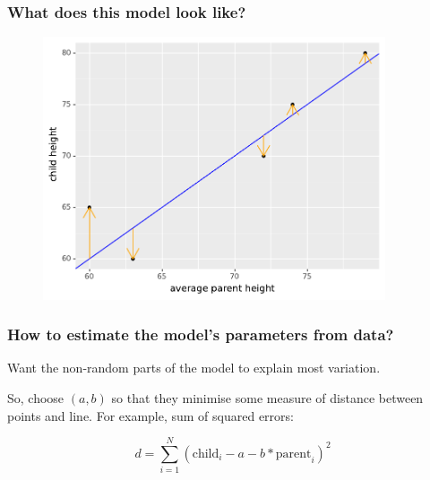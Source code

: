\documentclass[handout]{beamer}
\begin{document}
\begin{frame}
	\frametitle{What does this model look like?}
	
	\begin{figure}[ht]
		\centerline{\includegraphics[width=0.9\textwidth]{../figures/galton_model_with_residuals.pdf}}
	\end{figure}
	
\end{frame}

\begin{frame}
	\frametitle{How to estimate the model's parameters from data?}
	
	Want the non-random parts of the model to explain most variation.
	
	\vspace{0.5cm}
	
	So, choose $(a,b)$ so that they minimise some measure of distance between points and line. For example, sum of squared errors:
	
	\begin{equation}
	d = \sum_{i=1}^{N} (\text{child}_i - a - b * \text{parent}_i)^2
	\end{equation}
	
\end{frame}
\end{document}
